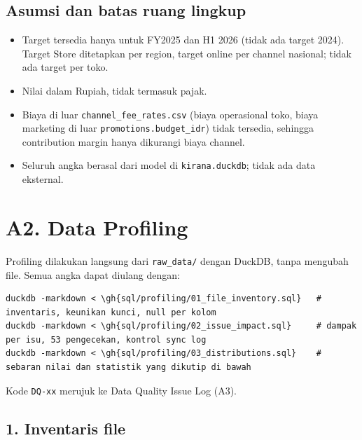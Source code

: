 \documentclass[10pt,a4paper]{article}
\newcommand{\gh}[1]{\href{https://github.com/titan2903/kirana-omnichannel-performance-intelligence/blob/master/#1}{#1}}  %
\providecommand{\tightlist}{\setlength{\itemsep}{1pt}\setlength{\parskip}{0pt}}
\begin{document}
\subsection{Asumsi dan batas ruang lingkup}\label{asumsi-dan-batas-ruang-lingkup}

\begin{itemize}
\tightlist
\item
  Target tersedia hanya untuk FY2025 dan H1 2026 (tidak ada target 2024). Target Store ditetapkan per region, target online per channel nasional; tidak ada target per toko.
\item
  Nilai dalam Rupiah, tidak termasuk pajak.
\item
  Biaya di luar \texttt{channel\_\allowbreak{}fee\_\allowbreak{}rates.csv} (biaya operasional toko, biaya marketing di luar \texttt{promotions.budget\_\allowbreak{}idr}) tidak tersedia, sehingga contribution margin hanya dikurangi biaya channel.
\item
  Seluruh angka berasal dari model di \texttt{kirana.duckdb}; tidak ada data eksternal.
\end{itemize}

\section{A2. Data Profiling}\label{a2.-data-profiling}

Profiling dilakukan langsung dari \texttt{raw\_\allowbreak{}data/} dengan DuckDB, tanpa mengubah file. Semua angka dapat
diulang dengan:

\begin{Verbatim}[commandchars=\\\{\},breaklines,fontsize=\scriptsize]
duckdb -markdown < \gh{sql/profiling/01_file_inventory.sql}   # inventaris, keunikan kunci, null per kolom
duckdb -markdown < \gh{sql/profiling/02_issue_impact.sql}     # dampak per isu, 53 pengecekan, kontrol sync log
duckdb -markdown < \gh{sql/profiling/03_distributions.sql}    # sebaran nilai dan statistik yang dikutip di bawah
\end{Verbatim}

Kode \texttt{DQ-xx} merujuk ke Data Quality Issue Log (A3).

\subsection{1. Inventaris file}\label{inventaris-file}
\end{document}
